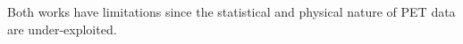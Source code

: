 \documentclass{IEEEtran}
\newcommand{\SST}[1]{{\color{orange}{#1}}\xspace}
\begin{document}
Both works have limitations since the statistical and physical nature of PET data are under-exploited.
\end{document}
